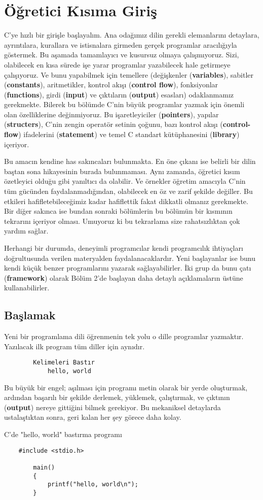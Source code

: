 \documentclass[a4paper,12pt,oneside]{book}
\begin{document}
\chapter{Öğretici Kısıma Giriş}
C'ye hızlı bir girişle başlayalım. Ana odağımız dilin gerekli elemanlarını detaylara, ayrıntılara, kurallara ve istisnalara girmeden gerçek programlar aracılığıyla göstermek. Bu aşamada tamamlayıcı ve kusursuz olmaya çalışmıyoruz. Sizi, olabilecek en kısa sürede işe yarar programlar yazabilecek hale getirmeye çalışıyoruz. Ve bunu yapabilmek için temellere (değişkenler (\textbf{variables}), sabitler (\textbf{constants}), aritmetikler, kontrol akışı (\textbf{control flow}), fonksiyonlar (\textbf{functions}), girdi (\textbf{input}) ve çıktıların (\textbf{output}) esasları) odaklanmamız gerekmekte. Bilerek bu bölümde C'nin büyük programlar yazmak için önemli olan özelliklerine değinmiyoruz. Bu işaretleyiciler (\textbf{pointers}), yapılar (\textbf{structers}), C'nin zengin operatör setinin çoğunu, bazı kontrol akışı (\textbf{control-flow}) ifadelerini (\textbf{statement}) ve temel C standart kütüphanesini (\textbf{library}) içeriyor.
\par Bu amacın kendine has sakıncaları bulunmakta. En öne çıkanı ise belirli bir dilin baştan sona hikayesinin burada bulunmaması. Aynı zamanda, öğretici kısım özetleyici olduğu gibi yanıltıcı da olabilir. Ve örnekler öğretim amacıyla C'nin tüm gücünden faydalanmadığından, olabilecek en öz ve zarif şekilde değiller. Bu etkileri hafifletebileceğimiz kadar hafiflettik fakat dikkatli olmanız gerekmekte. Bir diğer sakınca ise bundan sonraki bölümlerin bu bölümün bir kısmının tekrarını içeriyor olması. Umuyoruz ki bu tekrarlama size rahatsızlıktan çok yardım sağlar.
\par Herhangi bir durumda, deneyimli programcılar kendi programcılık ihtiyaçları doğrultusunda verilen materyalden faydalanacaklardır. Yeni başlayanlar ise bunu kendi küçük benzer programlarını yazarak sağlayabilirler. İki grup da bunu çatı (\textbf{framework}) olarak Bölüm 2'de başlayan daha detaylı açıklamaların üstüne kullanabilirler. \pagebreak

\section{Başlamak}

Yeni bir programlama dili öğrenmenin tek yolu o dille programlar yazmaktır. Yazılacak ilk program tüm diller için aynıdır.
\begin{lstlisting}
		Kelimeleri Bastır
			hello, world
\end{lstlisting}
\par Bu büyük bir engel; aşılması için programı metin olarak bir yerde oluşturmak, ardından başarılı bir şekilde derlemek, yüklemek, çalıştırmak, ve çıktının (\textbf{output}) nereye gittiğini bilmek gerekiyor. Bu mekaniksel detaylarda ustalaştıktan sonra, geri kalan her şey görece daha kolay.
    \par C'de "hello, world" bastırma programı
\begin{lstlisting}
    #include <stdio.h>

        main()
        {
            printf("hello, world\n");
        }
\end{lstlisting}
\end{document}
